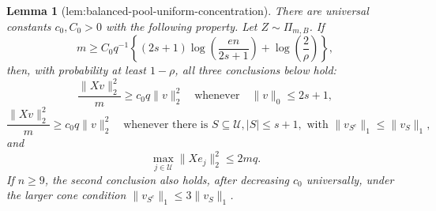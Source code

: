 \documentclass{article}
\newtheorem{lemma}{Lemma}
\begin{document}
\begin{lemma}[lem:balanced-pool-uniform-concentration]\label{lem:balanced-pool-uniform-concentration}
There are universal constants \(c_0,C_0>0\) with the following property.  Let \(Z\sim\Pi_{m,B}\).  If
\[
 m\ge C_0q^{-1}\left\{(2s+1)\log\!\left(\frac{en}{2s+1}\right)+\log\!\left(\frac2\rho\right)\right\},
\]
then, with probability at least \(1-\rho\), all three conclusions below hold:
\[
 \frac{\lVert Xv\rVert_2^2}{m}\ge c_0q\lVert v\rVert_2^2
 \quad\text{whenever}\quad
 \lVert v\rVert_0\le2s+1,
\]
\[
 \frac{\lVert Xv\rVert_2^2}{m}\ge c_0q\lVert v\rVert_2^2
 \quad\text{whenever there is }S\subseteq\mathcal U, |S|\le s+1,
 \text{ with }\lVert v_{S^c}\rVert_1\le\lVert v_S\rVert_1,
\]
and
\[
 \max_{j\in\mathcal U}\lVert Xe_j\rVert_2^2\le2mq.
\]
If \(n\ge9\), the second conclusion also holds, after decreasing \(c_0\) universally, under the larger cone condition \(\lVert v_{S^c}\rVert_1\le3\lVert v_S\rVert_1\).
\end{lemma}
\end{document}
